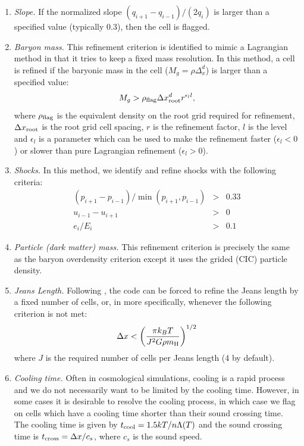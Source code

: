 \begin{enumerate}

\item{\em Slope.}  If the normalized slope $(q_{i+1} - q_{i-1})/ (2 q_i)$ is larger than a specified value (typically 0.3), then the cell is flagged.

\item{\em Baryon mass.}  This refinement criterion is identified to mimic a Lagrangian method in that it tries to keep a fixed mass resolution.  In this method, a cell is refined if the baryonic mass in the cell ($M_g = \rho \Delta_x^d$) is larger than a specified value:
\begin{equation}
M_g > \rho_{\rm flag} {\Delta x^d_{\rm root}} r^{\epsilon_l l},
\end{equation}
where $\rho_{\rm flag}$ is the equivalent density on the root grid required for refinement, $\Delta x_{\rm root}$ is the root grid cell spacing, $r$ is the refinement factor, $l$ is the level and $\epsilon_l$ is a parameter which can be used to make the refinement faster ($\epsilon_l < 0$) or slower than pure Lagrangian refinement ($\epsilon_l > 0$).

\item{\em Shocks.}  In this method, we identify and refine shocks with the following criteria:
\begin{eqnarray}
(p_{i+1} - p_{i-1})/\min(p_{i+1}, p_{i-1}) & > & 0.33  \nonumber \\
u_{i-1} - u_{i+1} & > & 0 \\
e_i / E_i & > & 0.1  \nonumber
\end{eqnarray}

\item{\em Particle (dark matter) mass.}  This refinement criterion is precisely the same as the baryon overdensity criterion except it uses the grided (CIC) particle density.

\item{\em Jeans Length.}  Following \cite{Truelove98}, the code can be forced to refine the Jeans length by a fixed number of cells, or, in more specifically, whenever the following criterion is not met:
\begin{equation}
\Delta x < \left( \frac{\pi k_B T}{J^2 G \rho \mh} \right)^{1/2}
\end{equation}
where $J$ is the required number of cells per Jeans length (4 by default).

\item{\em Cooling time.}  Often in cosmological simulations, cooling is a rapid process and we do not necessarily want to be limited by the cooling time.  However, in some cases it is desirable to resolve the cooling process, in which case we flag on cells which have a cooling time shorter than their sound crossing time.  The cooling time is given by $t_{\rm cool} = 1.5 kT / n \Lambda(T)$ and the sound crossing time is $t_{\rm cross} = \Delta x / c_s$, where $c_s$ is the sound speed.


\end{enumerate}
